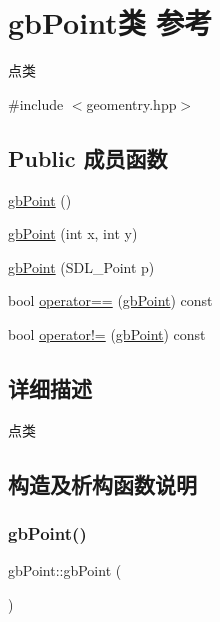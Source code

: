 \hypertarget{classgb_point}{}\section{gb\+Point类 参考}
\label{classgb_point}


点类  




{\ttfamily \#include $<$geomentry.\+hpp$>$}

\subsection*{Public 成员函数}
\begin{DoxyCompactItemize}
\item 
\mbox{\hyperlink{classgb_point_a7d9c23d0ce16d07461f66ea44f7cde20}{gb\+Point}} ()
\item 
\mbox{\hyperlink{classgb_point_a996a435065205fc3122ee264d30e1b87}{gb\+Point}} (int x, int y)
\item 
\mbox{\hyperlink{classgb_point_aab8e815703f5806ab7c695debcc548a4}{gb\+Point}} (S\+D\+L\+\_\+\+Point p)
\item 
bool \mbox{\hyperlink{classgb_point_ad7098c927e18d1d326fd9d68c0d4f7f9}{operator==}} (\mbox{\hyperlink{classgb_point}{gb\+Point}}) const
\item 
bool \mbox{\hyperlink{classgb_point_a0e466493a4b7c6d3537a6d514c06f7b9}{operator!=}} (\mbox{\hyperlink{classgb_point}{gb\+Point}}) const
\end{DoxyCompactItemize}


\subsection{详细描述}
点类 

\subsection{构造及析构函数说明}
\mbox{\label{classgb_point_a7d9c23d0ce16d07461f66ea44f7cde20}} 
\subsubsection{\texorpdfstring{gbPoint()}{gbPoint()}\hspace{0.1cm}{\footnotesize\ttfamily [1/3]}}
{\footnotesize\ttfamily gb\+Point\+::gb\+Point (\begin{DoxyParamCaption}{ }\end{DoxyParamCaption})}

